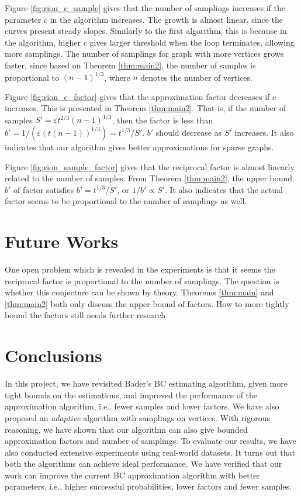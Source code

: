 \documentclass[10pt]{article}
\begin{document}
Figure \ref{fig:rion_c_sample} gives that the number of samplings increases if the parameter $c$ in the algorithm increases. The growth is almost linear, since the curves present steady slopes. Similarly to the first algorithm, this is because in the algorithm, higher $c$ gives larger threshold when the loop terminates, allowing more samplings. The number of samplings for graph with more vertices grows faster, since based on Theorem \ref{thm:main2}, the number of samples is proportional to $(n-1)^{1/3}$, where $n$ denotes the number of vertices.

Figure \ref{fig:rion_c_factor} gives that the approximation factor decreases if $c$ increases. This is presented in Theorem \ref{thm:main2}. That is, if the number of samples $S'=\varepsilon t^{2/3}(n-1)^{1/3}$, then the factor is less than $b' = 1/(\varepsilon (t(n-1))^{1/3}) = t^{1/3}/S'$. $b'$ should decrease as $S'$ increases. It also indicates that our algorithm gives better approximations for sparse graphs. 

Figure \ref{fig:rion_sample_factor} gives that the reciprocal factor is almost linearly related to the number of samples. From Theorem \ref{thm:main2}, the upper bound $b'$ of factor satisfies $b' = t^{1/3}/S'$, or $1/b' \propto S'$. It also indicates that the actual factor seems to be proportional to the number of samplings as well.

\section{Future Works}
One open problem which is revealed in the experiments is that it seems the reciprocal factor is proportional to the number of samplings. The question is whether this conjecture can be shown by theory. Theorems \ref{thm:main} and \ref{thm:main2} both only discuss the upper bound of factors. How to more tightly bound the factors still needs further research.

\section{Conclusions}
In this project, we have revisited Bader's BC estimating algorithm, given more tight bounds on the estimations, and improved the performance of the approximation algorithm, i.e., fewer samples and lower factors. We have also proposed an \emph{adaptive} algorithm with samplings on vertices. With rigorous reasoning, we have shown that our algorithm can also give bounded approximation factors and number of samplings. To evaluate our results, we have also conducted extensive experiments using real-world datasets. It turns out that both the algorithms can achieve ideal performance. We have verified that our work can improve the current BC approximation algorithm with better parameters, i.e., higher successful probabilities, lower factors and fewer samples.



\end{document}
